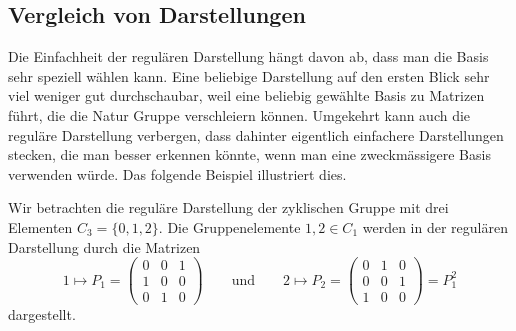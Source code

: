 \subsection{Vergleich von Darstellungen}
Die Einfachheit der regulären Darstellung hängt davon ab, dass man die
Basis sehr speziell wählen kann.
Eine beliebige Darstellung auf den ersten Blick sehr viel weniger gut
durchschaubar, weil eine beliebig gewählte Basis zu Matrizen führt,
die die Natur Gruppe verschleiern können.
Umgekehrt kann auch die reguläre Darstellung verbergen, dass dahinter
eigentlich einfachere Darstellungen stecken, die man besser erkennen
könnte, wenn man eine zweckmässigere Basis verwenden würde.
Das folgende Beispiel illustriert dies.

\begin{beispiel}
\label{buch:gruppen:darstellung:bsp:c3}
Wir betrachten die reguläre Darstellung der zyklischen Gruppe mit
drei Elementen $C_3=\{0,1,2\}$.
Die Gruppenelemente $1,2\in C_1$ werden in der regulären Darstellung
durch die Matrizen
\[
1\mapsto
P_1=
\begin{pmatrix}
0&0&1\\
1&0&0\\
0&1&0
\end{pmatrix}
\qquad\text{und}\qquad
2\mapsto
P_2
=
\begin{pmatrix}
0&1&0\\
0&0&1\\
1&0&0
\end{pmatrix}
=
P_1^2
\]
dargestellt.


\end{beispiel}
